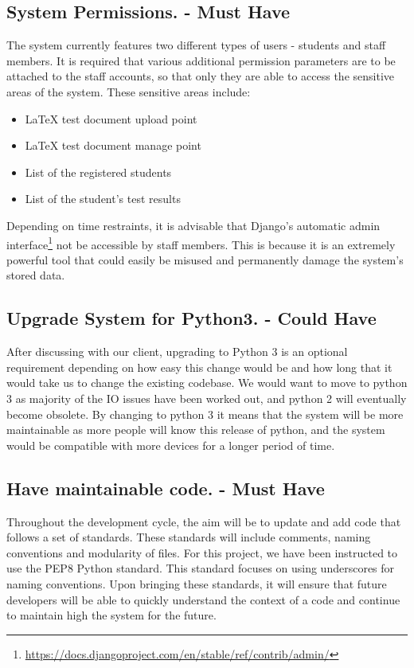 \documentclass[12pt]{article}
\begin{document}
	\subsection{System Permissions. - Must Have}
	The system currently features two different types of users - students and staff members. It is required that various additional permission parameters are to be attached to the staff accounts, so that only they are able to access the sensitive areas of the system. These sensitive areas include:
	\begin{itemize}  
        \item LaTeX test document upload point
        \item LaTeX test document manage point
        \item List of the registered students
        \item List of the student's test results
    \end{itemize}
    Depending on time restraints, it is advisable that Django's automatic admin interface\footnote{\url{https://docs.djangoproject.com/en/stable/ref/contrib/admin/}} not be accessible by staff members. This is because it is an extremely powerful tool that could easily be misused and permanently damage the system's stored data.

	\subsection{Upgrade System for Python3. - Could Have}
	After discussing with our client, upgrading to Python 3 is an optional requirement depending on how easy this change would be and how long that it would take us to change the existing codebase. 
We would want to move to python 3 as majority of the IO issues have been worked out, and python 2 will eventually become obsolete. By changing to python 3 it means that the system will be more maintainable as more people will know this release of python, and the system would be compatible with more devices for a longer period of time.

	\subsection{Have maintainable code. - Must Have}
	Throughout the development cycle, the aim will be to update and add code that follows a set of standards. These standards will include comments, naming conventions and modularity of files. For this project, we have been instructed to use the PEP8 Python standard. This standard focuses on using underscores for naming conventions. Upon bringing these standards, it will ensure that future developers will be able to quickly understand the context of a code and continue to maintain high the system for the future.
	
\end{document}
